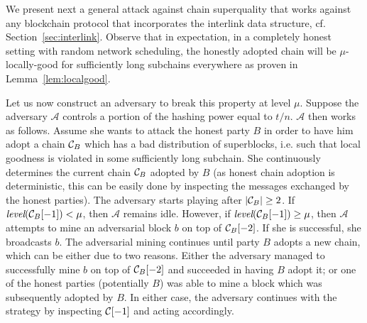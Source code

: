 We present next a general attack against chain superquality
that works against any blockchain protocol that incorporates
the interlink data structure, cf. Section~\ref{sec:interlink}.
Observe that in expectation, in a
completely honest setting with random network scheduling, the honestly adopted
chain will be $\mu$-locally-good for sufficiently long subchains everywhere as
proven in Lemma~\ref{lem:localgood}.

Let us now construct an adversary to break this property at level $\mu$. Suppose
the adversary $\mathcal{A}$ controls a portion of the hashing power equal to
$t/n$. $\mathcal{A}$ then works as follows. Assume she wants to attack the
honest party $B$ in order to have him adopt a chain $\mathcal{C}_B$ which has a bad
distribution of superblocks, i.e. such that local goodness is violated in some
sufficiently long subchain. She continuously determines the current chain
$\mathcal{C}_B$ adopted by $B$ (as honest chain adoption is deterministic, this can
be easily done by inspecting the messages exchanged by the honest parties). The
adversary starts playing after $|\mathcal{C}_B| \geq 2$. If
$\textit{level}(\mathcal{C}_B[-1]) < \mu$, then $\mathcal{A}$ remains idle. However,
if $\textit{level}(\mathcal{C}_B[-1]) \geq \mu$, then $\mathcal{A}$ attempts to mine
an adversarial block $b$ on top of $\mathcal{C}_B[-2]$. If she is successful, she
broadcasts $b$. The adversarial mining continues until party $B$ adopts a new
chain, which can be either due to two reasons. Either the adversary managed to
successfully mine $b$ on top of $\mathcal{C}_B[-2]$ and succeeded in having $B$ adopt
it; or one of the honest parties (potentially $B$) was able to mine a block
which was subsequently adopted by $B$. In either case, the adversary continues
with the strategy by inspecting $\mathcal{C}[-1]$ and acting accordingly.


